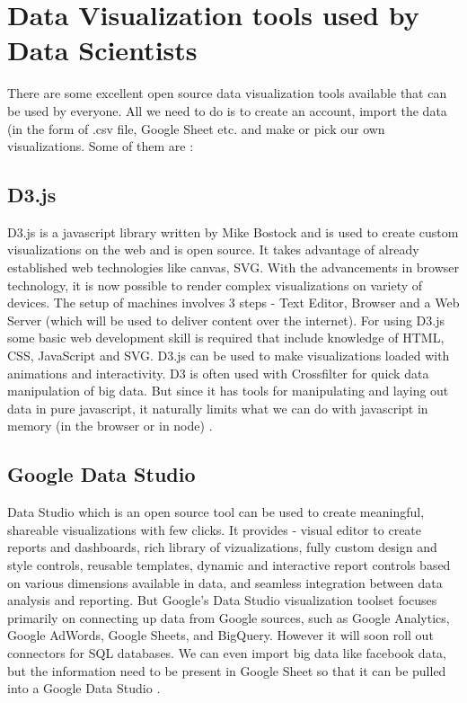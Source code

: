 \section{Data Visualization tools used by Data Scientists}

There are some excellent open source data visualization tools available that can be used by everyone. All we need to do is to create an account, import the data (in the form of .csv file, Google Sheet etc. and make or pick our own visualizations. Some of them are :

\subsection*{D3.js}

D3.js is a javascript library written by Mike Bostock and is used to create custom visualizations on the web and is open source. It takes advantage of already established web technologies like canvas, SVG. With the advancements in browser technology, it is now possible to render complex visualizations on variety of devices. The setup of machines involves 3 steps - Text Editor, Browser and a Web Server (which will be used to deliver content over the internet). For using D3.js some basic web development skill is required that include knowledge of HTML, CSS, JavaScript and SVG.
D3.js can be used to make visualizations loaded with animations and interactivity. D3 is often used with Crossfilter for quick data manipulation of big data. But since it has tools for manipulating and laying out data in pure javascript, it naturally limits what we can do with javascript in memory (in the browser or in node) \cite{D3}.\\


\subsection*{Google Data Studio}

Data Studio which is an open source tool can be used to create meaningful, shareable visualizations with few clicks. It provides - visual editor to create reports and dashboards, rich library of vizualizations, fully custom design and style controls, reusable templates, dynamic and interactive report controls based on various dimensions available in data, and seamless integration between data analysis and reporting. But Google's Data Studio visualization toolset focuses primarily on connecting up data from Google sources, such as Google Analytics, Google AdWords, Google Sheets, and BigQuery. However it will soon roll out connectors for SQL databases. We can even import big data like facebook data, but the information need to be present in Google Sheet so that it can be pulled into a Google Data Studio \cite{Google}. \\

